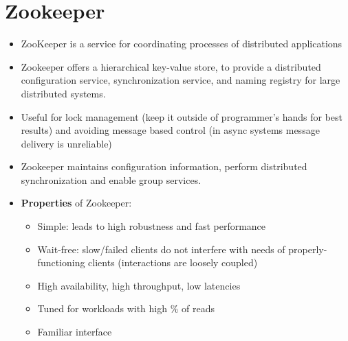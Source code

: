 \documentclass{article}
\begin{document}
\section{Zookeeper}
\begin{itemize}
    \item ZooKeeper is a service for coordinating processes of distributed applications
    
    \item Zookeeper offers a hierarchical key-value store, to provide a distributed configuration service, synchronization service, and naming registry for large distributed systems.

    
    \item Useful for lock management (keep it outside of programmer's hands for best results) and avoiding message based control (in async systems message delivery is unreliable)
    
    \item Zookeeper maintains configuration information, perform distributed synchronization and enable group services.
    
    \item \textbf{Properties} of Zookeeper:
    \begin{itemize}
        \item Simple: leads to high robustness and fast performance 
        
        \item Wait-free: slow/failed clients do not interfere with needs of properly-functioning clients (interactions are loosely coupled)
        
        \item High availability, high throughput, low latencies
        
        \item Tuned for workloads with high \% of reads
        
        \item Familiar interface
    \end{itemize}
\end{itemize}
\end{document}
